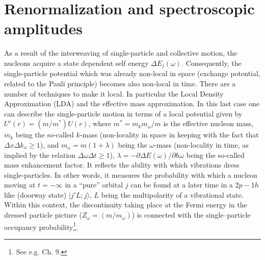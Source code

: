 \section{Renormalization and spectroscopic amplitudes}\label{S3.2}
As a result of the interweaving of single-particle and collective motion, the nucleons acquire a state dependent self energy $\Delta E_j(\omega)$.   Consequently, the single-particle potential which was already non-local in space (exchange potential, related to the Pauli principle) becomes also non-local in time. There are a number of techniques to make it local. In particular the Local Density Approximation (LDA) and the effective mass approximation. In this last case one can describe the single-particle motion in terms of a local potential  given by $U'(r)=(m/m^*)U(r)$, where $m^*=m_km_\omega/m$ is the effective nucleon mass, $m_k$ being the so-called $k$-mass (non-locality in space in keeping with the fact that $\Delta x\Delta k_x\geq1$), and $m_\omega=m(1+\lambda)$ being the $\omega$-mass (non-locality in time, as implied by the relation $\Delta \omega\Delta t\geq1$),  $\lambda=-\partial \Delta E(\omega)/\partial \hbar \omega$ being the so-called mass enhancement factor. It reflects the ability with which vibrations dress single-particles. In other words, it measures the probability with which a nucleon moving at  $t=-\infty$ in a ``pure'' orbital $j$ can be found at a later time in a 2$p-1h$ like (doorway state) $|j'L;j\rangle$, $L$ being the multipolarity of a vibrational state. Within this context, the discontinuity taking place at the Fermi energy in the dressed particle picture ($Z_\omega=(m/m_\omega)$) is connected with the single--particle occupancy probability\footnote{See e.g. \cite{Brink:05} Ch. 9.}.


